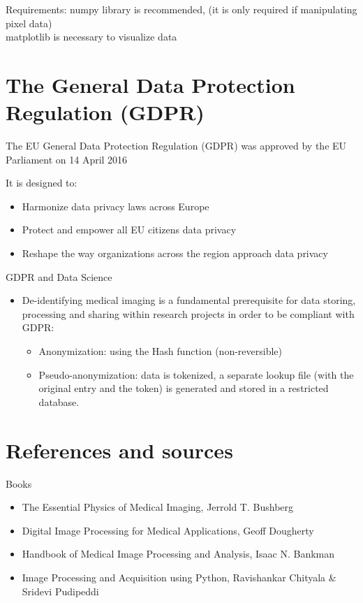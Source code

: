 Requirements: numpy library is recommended, (it is only required if manipulating pixel data)\\
matplotlib is necessary to visualize data


\section{The General Data Protection Regulation (GDPR)}

The EU General Data Protection Regulation (GDPR) was approved by the EU Parliament on 14 April 2016

It is designed to:
\begin{itemize}
	\item Harmonize data privacy laws across Europe
	\item Protect and empower all EU citizens data privacy
	\item Reshape the way organizations across the region approach data privacy
\end{itemize}

GDPR and Data Science
\begin{itemize}
	\item De-identifying medical imaging is a fundamental prerequisite for data storing, processing and sharing within research projects in order to be compliant with GDPR:
	\begin{itemize}
		\item Anonymization: using the Hash function (non-reversible)
		\item Pseudo-anonymization: data is tokenized, a separate lookup file (with the original entry and
		the token) is generated and stored in a restricted database.
	\end{itemize}
\end{itemize}

\section{References and sources}
Books
\begin{itemize}
	\item The Essential Physics of Medical Imaging, Jerrold T. Bushberg
	\item Digital Image Processing for Medical Applications, Geoff Dougherty
	\item Handbook of Medical Image Processing and Analysis, Isaac N. Bankman
	\item Image Processing and Acquisition using Python, Ravishankar Chityala \& Sridevi Pudipeddi
\end{itemize}

